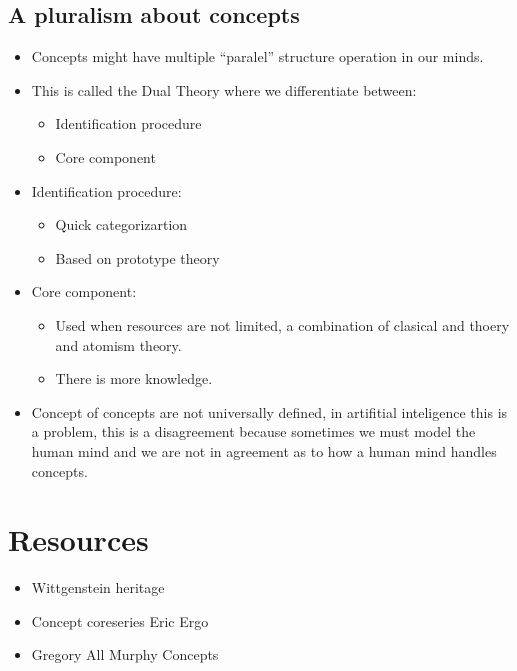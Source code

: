\subsection{A pluralism about concepts}
\begin{itemize}
    \item Concepts might have multiple ``paralel'' structure operation in our minds.
    \item This is called the Dual Theory where we differentiate between:
        \begin{itemize}
            \item Identification procedure 
            \item Core component 
        \end{itemize}
    
    \item Identification procedure:
        \begin{itemize}
            \item Quick categorizartion 
            \item Based on prototype theory 
        \end{itemize}
    
    \item Core component: 
        \begin{itemize}
            \item Used when resources are not limited, a combination of clasical and thoery and atomism theory.
            \item There is more knowledge.
        \end{itemize}
    
    \item Concept of concepts are not universally defined, in artifitial inteligence this is a problem, this is a disagreement because sometimes we must model the human mind and we are not in agreement as to how a human mind handles concepts.
\end{itemize}

\section{Resources}
\begin{itemize}
    \item Wittgenstein heritage 
    \item Concept coreseries Eric Ergo
    \item Gregory All Murphy Concepts
\end{itemize}
